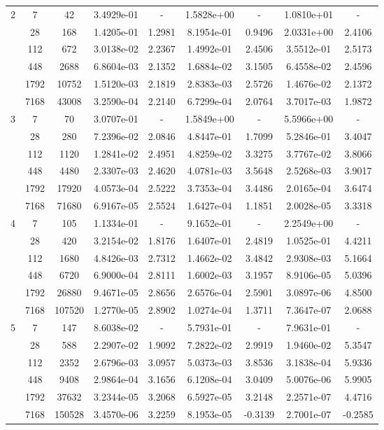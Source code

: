 \begin{longtable}{| c | c c | c c | c c | c c |}
	\hline

	2	& 7 & 42 & 3.4929e-01 & - & 1.5828e+00 & - & 1.0810e+01 & - \\
		& 28 & 168 & 1.4205e-01 & 1.2981 & 8.1954e-01 & 0.9496 & 2.0331e+00 & 2.4106 \\
		& 112 & 672 & 3.0138e-02 & 2.2367 & 1.4992e-01 & 2.4506 & 3.5512e-01 & 2.5173 \\
		& 448 & 2688 & 6.8604e-03 & 2.1352 & 1.6884e-02 & 3.1505 & 6.4558e-02 & 2.4596 \\
		& 1792 & 10752 & 1.5120e-03 & 2.1819 & 2.8383e-03 & 2.5726 & 1.4676e-02 & 2.1372 \\
		& 7168 & 43008 & 3.2590e-04 & 2.2140 & 6.7299e-04 & 2.0764 & 3.7017e-03 & 1.9872 \\

	\hline

	3	& 7 & 70 & 3.0707e-01 & - & 1.5849e+00 & - & 5.5966e+00 & - \\
		& 28 & 280 & 7.2396e-02 & 2.0846 & 4.8447e-01 & 1.7099 & 5.2846e-01 & 3.4047 \\
		& 112 & 1120 & 1.2841e-02 & 2.4951 & 4.8259e-02 & 3.3275 & 3.7767e-02 & 3.8066 \\
		& 448 & 4480 & 2.3307e-03 & 2.4620 & 4.0781e-03 & 3.5648 & 2.5268e-03 & 3.9017 \\
		& 1792 & 17920 & 4.0573e-04 & 2.5222 & 3.7353e-04 & 3.4486 & 2.0165e-04 & 3.6474 \\
		& 7168 & 71680 & 6.9167e-05 & 2.5524 & 1.6427e-04 & 1.1851 & 2.0028e-05 & 3.3318 \\

	\hline

	4	& 7 & 105 & 1.1334e-01 & - & 9.1652e-01 & - & 2.2549e+00 & - \\
		& 28 & 420 & 3.2154e-02 & 1.8176 & 1.6407e-01 & 2.4819 & 1.0525e-01 & 4.4211 \\
		& 112 & 1680 & 4.8426e-03 & 2.7312 & 1.4662e-02 & 3.4842 & 2.9308e-03 & 5.1664 \\
		& 448 & 6720 & 6.9000e-04 & 2.8111 & 1.6002e-03 & 3.1957 & 8.9106e-05 & 5.0396 \\
		& 1792 & 26880 & 9.4671e-05 & 2.8656 & 2.6576e-04 & 2.5901 & 3.0897e-06 & 4.8500 \\
		& 7168 & 107520 & 1.2770e-05 & 2.8902 & 1.0274e-04 & 1.3711 & 7.3647e-07 & 2.0688 \\

	\hline
	
	5	& 7 & 147 & 8.6038e-02 & - & 5.7931e-01 & - & 7.9631e-01 & - \\
		& 28 & 588 & 2.2907e-02 & 1.9092 & 7.2822e-02 & 2.9919 & 1.9460e-02 & 5.3547 \\
		& 112 & 2352 & 2.6796e-03 & 3.0957 & 5.0373e-03 & 3.8536 & 3.1838e-04 & 5.9336 \\
		& 448 & 9408 & 2.9864e-04 & 3.1656 & 6.1208e-04 & 3.0409 & 5.0076e-06 & 5.9905 \\
		& 1792 & 37632 & 3.2344e-05 & 3.2068 & 6.5927e-05 & 3.2148 & 2.2571e-07 & 4.4716 \\
		& 7168 & 150528 & 3.4570e-06 & 3.2259 & 8.1953e-05 & -0.3139 & 2.7001e-07 & -0.2585 \\
	

\end{longtable}
